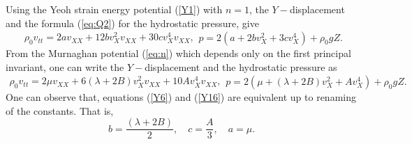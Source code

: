 \documentclass[11pt,letter,subeqn,fleqn]{article}
\numberwithin{equation}{section}
\numberwithin{table}{section}
\numberwithin{figure}{section}
\begin{document}
\medskip
\noindent Using the Yeoh strain energy potential (\ref{Y1}) with $n=1$, the $Y-$displacement and the formula (\ref{eq:Q2}) for the hydrostatic pressure, give
\begin{subequations}\label{Y5}
	\begin{equation}\label{Y6}
	\begin{split}
	\rho_{0} v_{tt} =2av_{XX}+12bv^{2}_{X}v_{XX}+30cv^{4}_{X}v_{XX},
	\end{split}
	\end{equation}
	\begin{equation}\label{Y7}
	p=2\left(a+2bv^{2}_{X}+3cv^{4}_{X}\right)+\rho_{0}gZ.
	\end{equation}
\end{subequations}
From the Murnaghan potential (\ref{eq:n}) which depends only on the first principal invariant, one can write the $Y-$displacement and the hydrostatic pressure as
\begin{subequations}\label{Y15}
	\begin{equation}\label{Y16}
	\begin{split}
	\rho_{0} v_{tt} =2{\mu}v_{XX}+6(\lambda+2B)v^{2}_{X}v_{XX}+10Av^{4}_{X}v_{XX},
	\end{split}
	\end{equation}
	\begin{equation}\label{Y17}
	p=2\left(\mu+(\lambda+2B)v^{2}_{X}+Av^{4}_{X}\right)+\rho_{0}gZ.
	\end{equation}
\end{subequations}
One can observe that, equations (\ref{Y6}) and (\ref{Y16}) are equivalent up to renaming of the constants. That is,
\begin{equation}\label{Y177}
b=\frac{\left(\lambda+2B\right)}{2}, \quad c=\frac{A}{3}, \quad a=\mu.
\end{equation}
\end{document}
